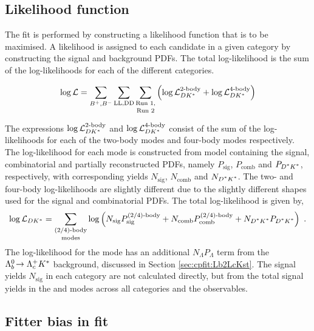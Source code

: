\subsection{Likelihood function}
\label{sec:cpfit:likelihood}

The \CP fit is performed by constructing a likelihood function that is to be maximised. A likelihood is assigned to each candidate in a given category by constructing the signal and background PDFs. The total log-likelihood is the sum of the log-likelihoods for each of the different categories.

\begin{equation}
\log\mathcal{L} = \sum_{{{{B}^+}},{{{B}^-}}}\sum_{\text{LL,DD}}\mathop{\sum_{\text{Run 1,}}}_{\text{Run 2}} \left( \log\mathcal{L}_{{D}{{K}^*}}^{\text{2-body}} + \log\mathcal{L}_{{D}{{K}^*}}^{\text{4-body}} \right)
\end{equation}

The expressions $\log\mathcal{L}_{{D}{{K}^*}}^{\text{2-body}}$ and $\log\mathcal{L}_{{D}{{K}^*}}^{\text{4-body}}$ consist of the sum of the log-likelihoods for each of the two-body modes and four-body modes respectively. The log-likelihood for each mode is constructed from model containing the signal, combinatorial and partially reconstructed PDFs, namely $P_{\text{sig}}$, $P_{\text{comb}}$ and $P_{\text{\Dstar\Kstar}}$, respectively, with corresponding yields $N_{\text{sig}}$, $N_{\text{comb}}$ and $N_{\text{\Dstar\Kstar}}$. The two- and four-body log-likelihoods are slightly different due to the slightly different shapes used for the signal and combinatorial PDFs. The total log-likelihood is given by,
\begin{equation}
\log\mathcal{L}_{\D\Kstar} = \mathop{\sum_{\text{(2/4)-body}}}_{\text{modes}} \log\left(N_{\text{sig}}P_{\text{sig}}^{\text{(2/4)-body}} + N_{\text{comb}}P_{\text{comb}}^{\text{(2/4)-body}} + N_{\text{\Dstar\Kstar}}P_{\text{\Dstar\Kstar}}\right) \text{ .}
\label{likelihood}
\end{equation}
The log-likelihood for  the \kk mode has an additional $N_{\Lambda}P_{\Lambda}$ term from the ${{\Lambda}^0_{b}}\!\rightarrow {\ensuremath{{\Lambda}^+_{c}}}{\ensuremath{{K}^*}}$ background, discussed in Section \ref{sec:cpfit:Lb2LcKst}. The signal yields $N_{\text{sig}}$ in each category are not calculated directly, but from the total signal yields in the \kpi and \kpipipi modes across all categories and the \CP observables.

\subsection{Fitter bias in \CP fit}
\label{sec:cpfit:fitterbias}

